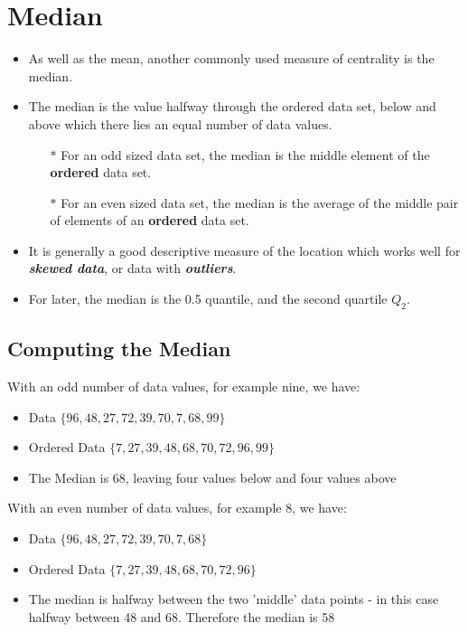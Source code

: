 \documentclass[a4paper,12pt]{article}
\begin{document}
\section*{Median}
	\begin{itemize}
		\item As well as the mean, another commonly used measure of centrality is the median.
		
		\item The median is the value halfway through the ordered data set, below and above which there lies an equal number of data values.
		\begin{itemize}
		\item[$\ast$] For an odd sized data set, the median is the middle element of the \textbf{ordered} data set.
		\item[$\ast$] For an even sized data set, the median is the average of the middle pair of elements of an \textbf{ordered} data set.
		\end{itemize}
		\item It is generally a good descriptive measure of the location which works well for \textbf{\emph{skewed data}}, or data with \textbf{\emph{outliers}}.
		
		\item For later, the median is the 0.5 quantile, and the second quartile $Q_2$.
	\end{itemize}

\subsection*{Computing the Median}

			
			
			With an odd number of data values, for example nine, we have: 
			\begin{itemize}
				\item Data  $\{96, 48, 27, 72, 39, 70, 7, 68, 99 \}$
				\item Ordered Data  $\{7, 27, 39, 48, 68, 70, 72, 96, 99\}$
				\item The Median is 68, leaving four values below and four values above 
			\end{itemize}
			\bigskip
			With an even number of data values, for example 8, we have: 
			\begin{itemize}
				\item Data  $\{96, 48 ,27 ,72, 39, 70, 7, 68  \}$
				\item Ordered Data  $\{7, 27, 39, 48, 68, 70, 72, 96\}$
				\item The median is halfway between the two 'middle' data points - in this case halfway between 48 and 68. Therefore the median is 58 
			\end{itemize}

	
\end{document}
